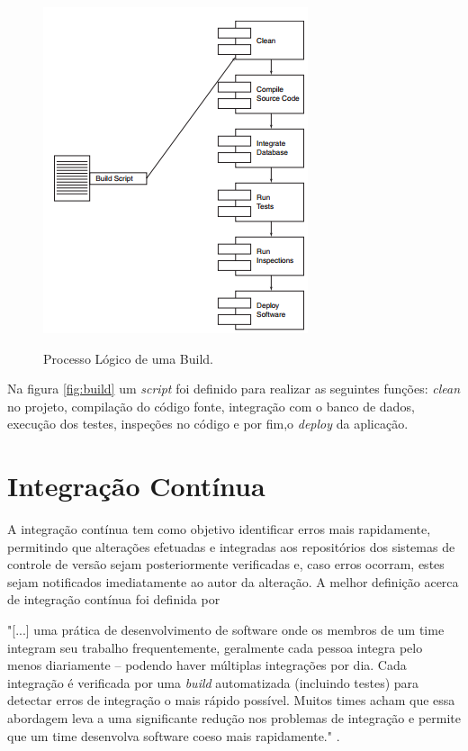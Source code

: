 \begin{figure}[H]
\centering
\caption[Processo Lógico de uma Build]{Processo Lógico de uma Build.}
\includegraphics[scale=0.9]{./images/build}
\label{fig:build}
\end{figure}
Na figura \autoref{fig:build} um \textit{script} foi definido para realizar as seguintes funções: \textit{clean} no projeto, compilação do código fonte, integração com o banco de dados, execução dos testes, inspeções no código e por fim,o \textit{deploy} da aplicação.



\section{Integração Contínua}\label{integracaocont}
\begin{OnehalfSpace}
A integração contínua tem como objetivo identificar erros mais rapidamente, permitindo que alterações efetuadas e integradas aos repositórios dos sistemas de controle de versão sejam posteriormente verificadas e, caso erros ocorram, estes sejam notificados imediatamente ao autor da alteração.
A melhor definição acerca de integração contínua foi definida por 
\end{OnehalfSpace}

\begin{citacao}
"[...] uma prática de desenvolvimento de software onde os membros de um time integram seu trabalho frequentemente, geralmente cada pessoa integra pelo menos diariamente – podendo haver múltiplas integrações por dia. Cada integração é verificada por uma \textit{build} automatizada (incluindo testes) para detectar erros de integração o mais rápido possível. Muitos times acham que essa abordagem leva a uma significante redução nos problemas de integração e permite que um time desenvolva software coeso mais rapidamente." .
\end{citacao}


